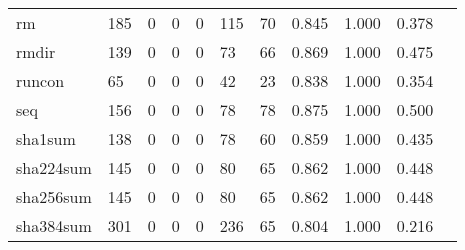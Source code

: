 \begin{longtable}{lp{1.10cm}p{1.10cm}p{1.10cm}p{1.10cm}p{1.10cm}p{1.10cm}p{1.10cm}p{1.10cm}p{1.10cm}p{1.10cm}}
rm        &                    185 &                                  0 &                                 0 &                                0 &                               115 &                              70 &                          0.845 &                                 1.000 &                               0.378 \\
rmdir     &                    139 &                                  0 &                                 0 &                                0 &                                73 &                              66 &                          0.869 &                                 1.000 &                               0.475 \\
runcon    &                     65 &                                  0 &                                 0 &                                0 &                                42 &                              23 &                          0.838 &                                 1.000 &                               0.354 \\
seq       &                    156 &                                  0 &                                 0 &                                0 &                                78 &                              78 &                          0.875 &                                 1.000 &                               0.500 \\
sha1sum   &                    138 &                                  0 &                                 0 &                                0 &                                78 &                              60 &                          0.859 &                                 1.000 &                               0.435 \\
sha224sum &                    145 &                                  0 &                                 0 &                                0 &                                80 &                              65 &                          0.862 &                                 1.000 &                               0.448 \\
sha256sum &                    145 &                                  0 &                                 0 &                                0 &                                80 &                              65 &                          0.862 &                                 1.000 &                               0.448 \\
sha384sum &                    301 &                                  0 &                                 0 &                                0 &                               236 &                              65 &                          0.804 &                                 1.000 &                               0.216 \\

\end{longtable}
